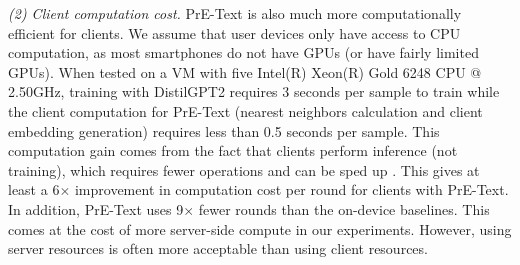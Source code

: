 \textit{(2) Client computation cost.}  PrE-Text is also much more computationally efficient for clients.  We assume that user devices only have access to CPU computation, as most smartphones do not have GPUs (or have fairly limited GPUs).  When tested on a VM with five Intel(R) Xeon(R) Gold 6248 CPU @ 2.50GHz, training with DistilGPT2 requires 3 seconds per sample to train while the client computation for PrE-Text (nearest neighbors calculation and client embedding generation) requires less than 0.5 seconds per sample. This computation gain comes from the fact that clients perform inference (not training), which requires fewer operations and can be sped up \citep{kwon2023efficient, reimers-2019-sentence-bert}. This gives at least a 6$\times$ improvement in computation cost per round for clients with PrE-Text. In addition, PrE-Text uses 9$\times$ fewer rounds than the on-device baselines. This comes at the cost of more server-side compute in our experiments. However, using server resources is often more acceptable than using client resources.
